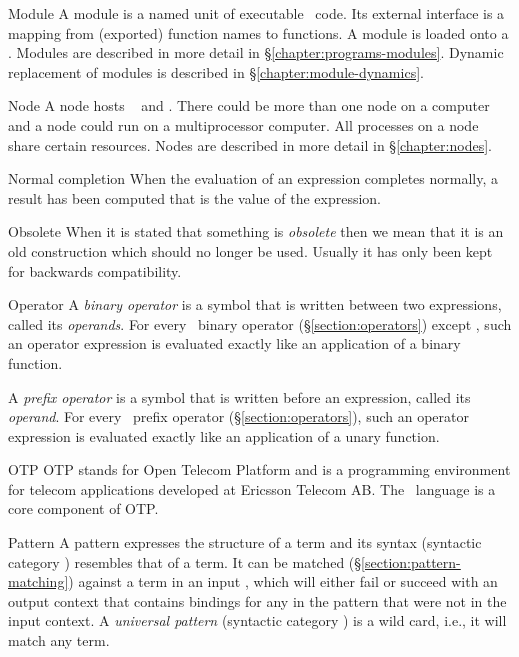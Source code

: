\begin{Lentry}
\item[Module]
A module is a named unit of executable \Erlang\ code.  Its external
interface is a mapping from (exported) function names to functions.  A
module is loaded onto a .  Modules are described in more
detail in \S\ref{chapter:programs-modules}.  Dynamic replacement of
modules is described in \S\ref{chapter:module-dynamics}.

\item[Node]
A node hosts \Erlang\  and .  There could be
more than one node on a computer and a node could run on a
multiprocessor computer.  All processes on a node share certain
resources. Nodes are described in more detail in
\S\ref{chapter:nodes}.

\item[Normal completion]
When the evaluation of an expression completes normally, a result has
been computed that is the value of the expression.

\item[Obsolete]
When it is stated that something is \emph{obsolete} then we mean that
it is an old construction which should no longer be used.  Usually it
has only been kept for backwards compatibility.

\item[Operator]
A \emph{binary operator} is a symbol that is written between two
expressions, called its \emph{operands}.
For every \Erlang\ binary operator (\S\ref{section:operators}) except
\T{=}, such an operator expression is evaluated exactly like an
application of a binary function.

A \emph{prefix operator} is a symbol that is written before an
expression, called its \emph{operand}.
For every \Erlang\ prefix operator (\S\ref{section:operators}), such
an operator expression is evaluated exactly like an application of a
unary function.

\item[OTP]
OTP stands for Open Telecom Platform \cite{otp-dev-ref} and is a
programming environment for telecom applications developed at Ericsson
Telecom AB.  The \Erlang\ language is a core component of OTP.

\item[Pattern]
A pattern expresses the structure of a term and its syntax (syntactic
category ) resembles that of a term.  It can be matched
(\S\ref{section:pattern-matching}) against a term in an input
, which will either fail or succeed with an output context
that contains bindings for any  in the pattern that were
not in the input context.  A \emph{universal pattern} (syntactic
category ) is a wild card, i.e., it will match
any term.


\end{Lentry}
